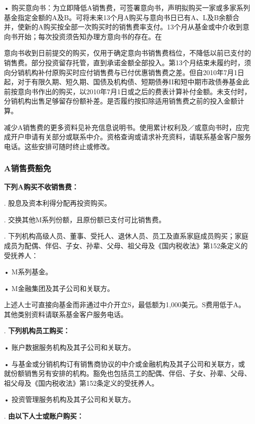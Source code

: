 \documentclass[UTF8,fontset=none,11pt,a4paper]{ctexart}
\begin{document}
\noindent • 购买意向书：为立即降低A销售费，可签署意向书，声明拟购买一家或多家系列基金指定金额的A及B。可将未来13个月A购买与意向书日已有A、L及B余额合并，使新的A购买按全部一次购买时的销售费率支付。13个月从基金或中介收到意向书开始；每次投资须告知办理方意向书的存在。在\par\smallskip
意向书收到日前提交的购买，仅用于确定意向书销售费档位，不降低以前已支付的销售费。部分投资留存托管，直到承诺金额全部投入。第13个月结束未履约时，须向分销机构补付原购买时应付销售费与已付优惠销售费之差。但自2010年7月1日起，对于有限久期、短久期、国债及机构债、短期债券II和短中期市政债券基金此前按意向书作出的购买，以2010年7月1日或之后的费表计算补付金额。未支付时，分销机构出售足够留存份额补差。是否履约按扣除适用销售费之前的投入\allowbreak\mbox{金额计算。}


减少A销售费的更多资料见补充信息说明书。使用累计权利及／或意向书时，应完成开户申请有关部分或联系中介。资格查询或请求补充资料，请联系基金客户服务电话。这些安排可随时终止\allowbreak\mbox{或修改。}

\subsubsection*{A销售费豁免}
\textbf{下列A购买不收销售费：}

. 股息及资本利得分配再\allowbreak\mbox{投资购买。}


. 交换其他M系列份额，且原份额已支付可\allowbreak\mbox{比销售费。}


. 下列机构高级人员、董事、受托人、退休人员、员工及直系家庭成员购买；家庭成员为配偶、伴侣、子女、孙辈、父母、祖父母及《国内税收法》第152条定义的\allowbreak\mbox{受抚养人：}


\noindent • M\allowbreak\mbox{系列基金。}\par\smallskip
\noindent • M金融集团及其子公司\allowbreak\mbox{和关联方。}\par\smallskip

\par{}\label{originalpage15}
上述人士可直接向基金而非通过中介开立S，最低额为1,000美元。S费用低于A。其他类别资料请联系基金客户服\allowbreak\mbox{务电话。}

. \textbf{下列机构员工购买：}


\noindent • 账户数据服务机构及其子公司\allowbreak\mbox{和关联方。}\par\smallskip
\noindent • 与基金或分销机构订有销售商协议的中介或金融机构及其子公司和关联方，或就份额销售另有安排的机构。豁免也包括员工的配偶、伴侣、子女、孙辈、父母、祖父母及《国内税收法》第152条定义的\allowbreak\mbox{受抚养人。}\par\smallskip
\noindent • 投资管理服务机构及其子公司\allowbreak\mbox{和关联方。}\par\smallskip
{}. \textbf{由以下人士或账户购买：}
\end{document}
